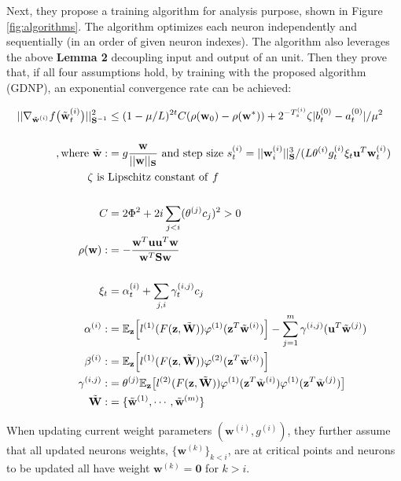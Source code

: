 \documentclass{article}
\begin{document}
Next, they propose a training algorithm for analysis purpose, shown in Figure \ref{fig:algorithms}. The algorithm optimizes each neuron independently and sequentially (in an order of given neuron indexes). The algorithm also leverages the above \textbf{Lemma 2} decoupling input and output of an unit. Then they prove that, if all four assumptions hold, by training with the proposed algorithm (GDNP), an exponential convergence rate can be achieved:

\begin{align*}
    ||\nabla_{\Tilde{\textbf{w}}^{(i)}}f\big(\Tilde{\textbf{w}}_t^{(i)}\big)||^2_{\textbf{S}^{-1}}&\leq(1-\mu/L)^{2t}C(\rho(\textbf{w}_0)-\rho(\textbf{w}^*))+2^{-T_s^{(i)}}\zeta|b_t^{(0)}-a_t^{(0)}|/\mu^2\\\\
    \mathrm{, where\ }\Tilde{\textbf{w}}:&=g\frac{\textbf{w}}{||\textbf{w}||_{\textbf{S}}} \mathrm{\ and\ step\ size\ } s_t^{(i)}=||\textbf{w}_i^{(i)}||^3_{\textbf{S}}/(L\theta^{(i)}g_t^{(i)}\xi_t\textbf{u}^T\textbf{w}_t^{(i)})\\
    \zeta\mathrm{\ is\ }&\mathrm{Lipschitz\ constant\ of\ }f\\\\
    C&=2\Phi^2+2i\sum_{j<i}(\theta^{(j)}c_j)^2>0\\
    \rho(\textbf{w}):&=-\frac{\textbf{w}^T\textbf{uu}^T\textbf{w}}{\textbf{w}^T\textbf{Sw}}\\\\
    \xi_t&=\alpha_t^{(i)}+\sum_{j,i}\gamma_t^{(i,j)}c_j\\
    \alpha^{(i)}:&=\mathbb{E}_{\textbf{z}}\Big[l^{(1)}(F(\textbf{z},\Tilde{\textbf{W}}))\varphi^{(1)}(\textbf{z}^T\Tilde{\textbf{w}}^{(i)})\Big]-\sum_{j=1}^m\gamma^{(i,j)}(\textbf{u}^T\Tilde{\textbf{w}}^{(j)})\\
    \beta^{(i)}:&=\mathbb{E}_{\textbf{z}}\Big[l^{(1)}(F(\textbf{z},\Tilde{\textbf{W}}))\varphi^{(2)}(\textbf{z}^T\Tilde{\textbf{w}}^{(i)})\Big]\\
    \gamma^{(i,j)}:&=\theta^{(j)}\mathbb{E}_{\textbf{z}}\big[l^{(2)}(F(\textbf{z},\Tilde{\textbf{W}}))\varphi^{(1)}(\textbf{z}^T\Tilde{\textbf{w}}^{(i)})\varphi^{(1)}(\textbf{z}^T\Tilde{\textbf{w}}^{(j)})\big]\\
    \Tilde{\textbf{W}}:&=\{\Tilde{\textbf{w}}^{(1)},\cdots,\Tilde{\textbf{w}}^{(m)}\}
\end{align*}

When updating current weight parameters $(\textbf{w}^{(i)}, g^{(i)})$, they further assume that all updated neurons weights, $\{\textbf{w}^{(k)}\}_{k<i}$, are at critical points and neurons to be updated all have weight $\textbf{w}^{(k)}=\textbf{0}$ for $k>i$.
\end{document}
